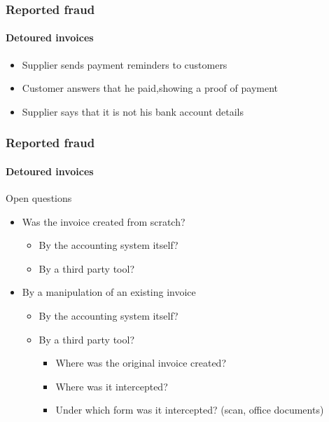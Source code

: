 
\begin{frame}[t,plain]
\titlepage
\end{frame}



\begin{frame}
    \frametitle{Reported fraud}
    \framesubtitle{Detoured invoices}
    \begin{itemize}
        \item Supplier sends payment reminders to customers
       \item Customer answers that he paid,showing a proof of payment
        \item Supplier says that it is not his bank account details
    \end{itemize}
\end{frame}

\begin{frame}
    \frametitle{Reported fraud}
    \framesubtitle{Detoured invoices}
    \begin{block}{Open questions}
        \begin{itemize}
            \item Was the invoice created from scratch?
                \begin{itemize}
                    \item By the accounting system itself?
                    \item By a third party tool?
                \end{itemize}
            \item By a manipulation of an existing invoice
                \begin{itemize}
                    \item By the accounting system itself?
                    \item By a third party tool?
                    \begin{itemize}
                        \item Where was the original invoice created?
                        \item Where was it intercepted?
                        \item Under which form was it intercepted? (scan, office documents)
                    \end{itemize}
                \end{itemize}
        \end{itemize}
    \end{block}
\end{frame}

